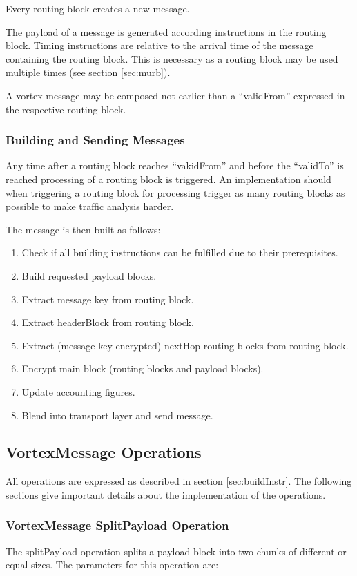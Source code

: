 Every routing block creates a new message.

The payload of a message is generated according instructions in the routing block. Timing instructions are relative to the arrival time of the message containing the routing block. This is necessary as a routing block may be used multiple times (see section \ref{sec:murb}).

A vortex message may be composed not earlier than a ``validFrom'' expressed in the respective routing block.

\subsubsection{Building and Sending Messages}
Any time after a routing block reaches ``vakidFrom'' and before the ``validTo'' is reached processing of a routing block is triggered. An implementation should when triggering a routing block for processing trigger as many routing blocks as possible to make traffic analysis harder.

The message is then built as follows:
\begin{enumerate}
	\item Check if all building instructions can be fulfilled due to their prerequisites.
	\item Build requested payload blocks.
	\item Extract message key from routing block.
	\item Extract headerBlock from routing block.
	\item Extract (message key encrypted) nextHop routing blocks from routing block.
	\item Encrypt main block (routing blocks and payload blocks).
	\item Update accounting figures.
	\item Blend into transport layer and send message.
\end{enumerate}


\subsection{VortexMessage Operations}
All operations are expressed as described in section \ref{sec:buildInstr}. The following sections give important details about the implementation of the operations.

\subsubsection{VortexMessage SplitPayload Operation}
The splitPayload operation splits a payload block into two chunks of different or equal sizes. The parameters for this operation are:

